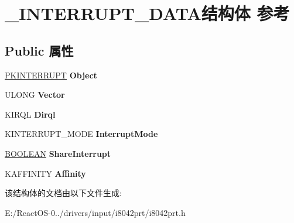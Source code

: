 \hypertarget{struct___i_n_t_e_r_r_u_p_t___d_a_t_a}{}\section{\+\_\+\+I\+N\+T\+E\+R\+R\+U\+P\+T\+\_\+\+D\+A\+T\+A结构体 参考}
\label{struct___i_n_t_e_r_r_u_p_t___d_a_t_a}
\subsection*{Public 属性}
\begin{DoxyCompactItemize}
\item 
\mbox{\label{struct___i_n_t_e_r_r_u_p_t___d_a_t_a_a3bfa63e8b3abd5fe53768792d4ed99a0}} 
\hyperlink{struct___k_i_n_t_e_r_r_u_p_t}{P\+K\+I\+N\+T\+E\+R\+R\+U\+PT} {\bfseries Object}
\item 
\mbox{\label{struct___i_n_t_e_r_r_u_p_t___d_a_t_a_af76639e29e2ae9bb378748a7aba499ec}} 
U\+L\+O\+NG {\bfseries Vector}
\item 
\mbox{\label{struct___i_n_t_e_r_r_u_p_t___d_a_t_a_ab8c66df390a38f127c3fb26870e5d6dc}} 
K\+I\+R\+QL {\bfseries Dirql}
\item 
\mbox{\label{struct___i_n_t_e_r_r_u_p_t___d_a_t_a_a2084152c24414fe2b153a22a6b852ffc}} 
K\+I\+N\+T\+E\+R\+R\+U\+P\+T\+\_\+\+M\+O\+DE {\bfseries Interrupt\+Mode}
\item 
\mbox{\label{struct___i_n_t_e_r_r_u_p_t___d_a_t_a_a329d4fd004d990afcdd29199f4c8301a}} 
\hyperlink{_processor_bind_8h_a112e3146cb38b6ee95e64d85842e380a}{B\+O\+O\+L\+E\+AN} {\bfseries Share\+Interrupt}
\item 
\mbox{\label{struct___i_n_t_e_r_r_u_p_t___d_a_t_a_af985d9a8e2365240efe38b038f5a15f3}} 
K\+A\+F\+F\+I\+N\+I\+TY {\bfseries Affinity}
\end{DoxyCompactItemize}


该结构体的文档由以下文件生成\+:\begin{DoxyCompactItemize}
\item 
E\+:/\+React\+O\+S-\/0../drivers/input/i8042prt/i8042prt.\+h\end{DoxyCompactItemize}
